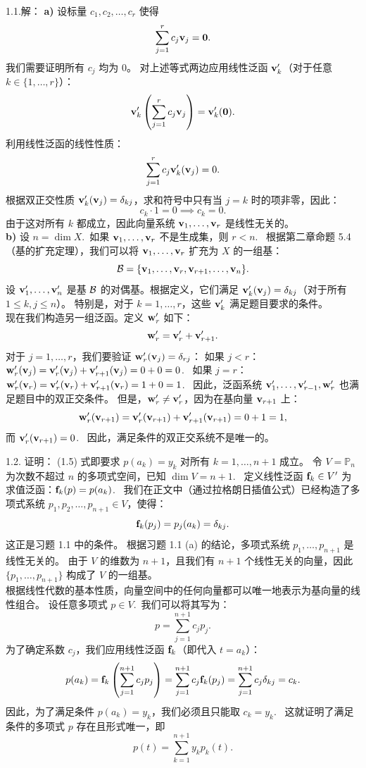 \begin{exer}


1.1.解：
\textbf{a)} 设标量 $c_1, c_2, \dots, c_r$ 使得
$$ \sum_{j=1}^r c_j \mathbf{v}_j = \mathbf{0}. $$
我们需要证明所有 $c_j$ 均为 0。
对上述等式两边应用线性泛函 $\mathbf{v}'_k$（对于任意 $k \in \{1, \dots, r\}$）：
$$ \mathbf{v}'_k\left( \sum_{j=1}^r c_j \mathbf{v}_j \right) = \mathbf{v}'_k(\mathbf{0}). $$
利用线性泛函的线性性质：
$$ \sum_{j=1}^r c_j \mathbf{v}'_k(\mathbf{v}_j) = 0. $$
根据双正交性质 $\mathbf{v}'_k(\mathbf{v}_j) = \delta_{kj}$，求和符号中只有当 $j=k$ 时的项非零，因此：
$$ c_k \cdot 1 = 0 \implies c_k = 0. $$
由于这对所有 $k$ 都成立，因此向量系统 $\mathbf{v}_1, \dots, \mathbf{v}_r$ 是线性无关的。
\\
\textbf{b)} 设 $n = \dim X$.~如果 $\mathbf{v}_1, \dots, \mathbf{v}_r$ 不是生成集，则 $r < n$.~
根据第二章命题 5.4（基的扩充定理），我们可以将 $\mathbf{v}_1, \dots, \mathbf{v}_r$ 扩充为 $X$ 的一组基：
$$ \mathcal{B}  = \{ \mathbf{v}_1, \dots, \mathbf{v}_r, \mathbf{v}_{r+1}, \dots, \mathbf{v}_n \}. $$
设 $\mathbf{v}'_1, \dots, \mathbf{v}'_n$ 是基 $\mathcal{B} $ 的对偶基。根据定义，它们满足 $\mathbf{v}'_k(\mathbf{v}_j) = \delta_{kj}$（对于所有 $1 \le k, j \le n$）。
特别是，对于 $k=1, \dots, r$，这些 $\mathbf{v}'_k$ 满足题目要求的条件。
\\
现在我们构造另一组泛函。定义 $\mathbf{w}'_r$ 如下：
$$ \mathbf{w}'_r = \mathbf{v}'_r + \mathbf{v}'_{r+1}. $$
对于 $j = 1, \dots, r$，我们要验证 $\mathbf{w}'_r(\mathbf{v}_j) = \delta_{rj}$：
如果 $j < r$：$\mathbf{w}'_r(\mathbf{v}_j) = \mathbf{v}'_r(\mathbf{v}_j) + \mathbf{v}'_{r+1}(\mathbf{v}_j) = 0 + 0 = 0$.~
如果 $j = r$：$\mathbf{w}'_r(\mathbf{v}_r) = \mathbf{v}'_r(\mathbf{v}_r) + \mathbf{v}'_{r+1}(\mathbf{v}_r) = 1 + 0 = 1$.~
因此，泛函系统 $\mathbf{v}'_1, \dots, \mathbf{v}'_{r-1}, \mathbf{w}'_r$ 也满足题目中的双正交条件。
但是，$\mathbf{w}'_r \neq \mathbf{v}'_r$，因为在基向量 $\mathbf{v}_{r+1}$ 上：
$$ \mathbf{w}'_r(\mathbf{v}_{r+1}) = \mathbf{v}'_r(\mathbf{v}_{r+1}) + \mathbf{v}'_{r+1}(\mathbf{v}_{r+1}) = 0 + 1 = 1, $$
而 $\mathbf{v}'_r(\mathbf{v}_{r+1}) = 0$.~
因此，满足条件的双正交系统不是唯一的。

1.2. 证明：
(1.5) 式即要求 $p(a_k) = y_k$ 对所有 $k=1, \dots, n+1$ 成立。
令 $V = \mathbb{P}_n$ 为次数不超过 $n$ 的多项式空间，已知 $\dim V = n+1$.~
定义线性泛函 $\mathbf{f}_k \in V'$ 为求值泛函：$\mathbf{f}_k(p) = p(a_k)$.~
我们在正文中（通过拉格朗日插值公式）已经构造了多项式系统 $p_1, p_2, \dots, p_{n+1} \in V$，使得：
$$ \mathbf{f}_k(p_j) = p_j(a_k) = \delta_{kj}. $$
这正是习题 1.1 中的条件。
根据习题 1.1 (a) 的结论，多项式系统 $p_1, \dots, p_{n+1}$ 是线性无关的。
由于 $V$ 的维数为 $n+1$，且我们有 $n+1$ 个线性无关的向量，因此 $\{p_1, \dots, p_{n+1}\}$ 构成了 $V$ 的一组基。
\\
根据线性代数的基本性质，向量空间中的任何向量都可以唯一地表示为基向量的线性组合。
设任意多项式 $p \in V$.~我们可以将其写为：
$$ p = \sum_{j=1}^{n+1} c_j p_j. $$
为了确定系数 $c_j$，我们应用线性泛函 $\mathbf{f}_k$（即代入 $t=a_k$）：
$$ p(a_k) = \mathbf{f}_k\left( \sum_{j=1}^{n+1} c_j p_j \right) = \sum_{j=1}^{n+1} c_j \mathbf{f}_k(p_j) = \sum_{j=1}^{n+1} c_j \delta_{kj} = c_k. $$
因此，为了满足条件 $p(a_k) = y_k$，我们必须且只能取 $c_k = y_k$.~
这就证明了满足条件的多项式 $p$ 存在且形式唯一，即
$$ p(t) = \sum_{k=1}^{n+1} y_k p_k(t). $$


\end{exer}
